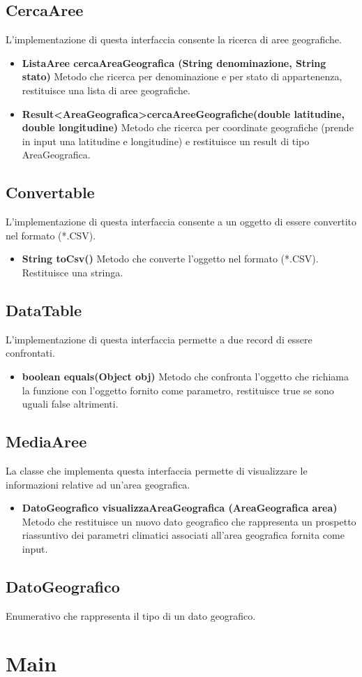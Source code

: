 \documentclass[a4paper, 12pt]{report}
\begin{document}
			\subsection{CercaAree}
			L'implementazione di questa interfaccia consente la ricerca di aree geografiche.
			\begin{itemize}
				\item \textbf{ListaAree cercaAreaGeografica (String denominazione, String stato)}
				Metodo che ricerca per denominazione e per stato di appartenenza, restituisce una lista di aree geografiche.
				\item\textbf{Result\textless AreaGeografica\textgreater cercaAreeGeografiche(double latitudine, double longitudine)}
				Metodo che ricerca per coordinate geografiche (prende in input una latitudine e longitudine) e restituisce un result di tipo AreaGeografica.
			\end{itemize}

			\subsection{Convertable}
			L'implementazione di questa interfaccia consente a un oggetto di essere convertito nel formato (*.CSV).
			\begin{itemize}
				\item \textbf{String toCsv()}
				Metodo che converte l'oggetto nel formato (*.CSV). Restituisce una stringa.
			\end{itemize}
			\subsection{DataTable}
			L'implementazione di questa interfaccia permette a due record di essere confrontati.
			\begin{itemize}
				\item\textbf{boolean equals(Object obj)}
				Metodo che confronta l'oggetto che richiama la funzione con l'oggetto fornito come parametro, restituisce true se sono uguali false altrimenti.
			\end{itemize}
			\subsection{MediaAree}
			La classe che implementa questa interfaccia permette di visualizzare le informazioni relative ad un'area geografica.
			\begin{itemize}
				\item\textbf {DatoGeografico visualizzaAreaGeografica (AreaGeografica area)} Metodo che restituisce un nuovo dato geografico che rappresenta un prospetto riassuntivo dei parametri climatici associati all'area geografica fornita come input.
			\end{itemize}
			\subsection{DatoGeografico}
			Enumerativo che rappresenta il tipo di un dato geografico.


		\section{Main}

	
\end{document}
